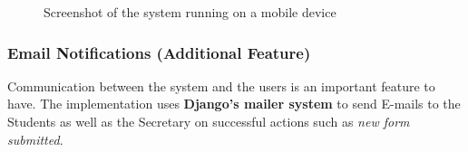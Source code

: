 \documentclass[../main.tex]{subfiles}
\begin{document}
\begin{figure}[H]
        \caption{\label{fig:mosbilesystem} Screenshot of the system running on a mobile device}
      \end{figure}

\subsubsection{Email Notifications (Additional Feature)}
Communication between the system and the users is an important feature to have. The implementation uses \textbf{Django's mailer system} to send E-mails to the Students as well as the Secretary on successful actions such as \textit{new form submitted}.
\end{document}
